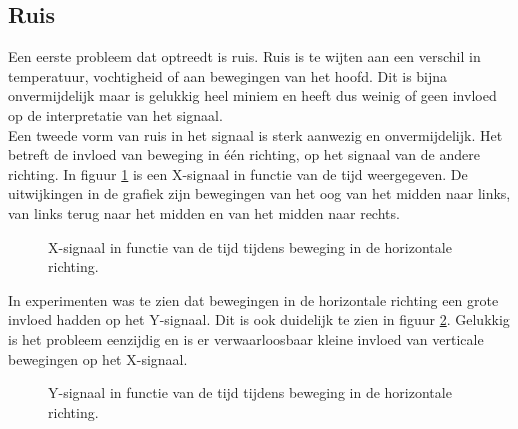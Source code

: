 \documentclass{article}
\newcommand{\figwidth}{0.82\linewidth}
\begin{document}
\subsection{Ruis}
Een eerste probleem dat optreedt is ruis. Ruis is te wijten aan een verschil in temperatuur, vochtigheid of aan bewegingen van het hoofd. Dit is bijna onvermijdelijk maar is gelukkig heel miniem en heeft dus weinig of geen invloed op de interpretatie van het signaal.\\
Een tweede vorm van ruis in het signaal is sterk aanwezig en onvermijdelijk. Het betreft de invloed van beweging in \'e\'en richting, op het signaal van de andere richting. In figuur \ref{fig:grafiekgevoeligheidY_2} is een X-signaal in functie van de tijd weergegeven. De uitwijkingen in de grafiek zijn bewegingen van het oog van het midden naar links, van links terug naar het midden en van het midden naar rechts.\\
\begin{figure}[H]
	\centering
	\caption{X-signaal in functie van de tijd tijdens beweging in de horizontale richting.}
	\label{fig:grafiekgevoeligheidY_2}
\end{figure}
In experimenten was te zien dat bewegingen in de horizontale richting een grote invloed hadden op het Y-signaal. Dit is ook duidelijk te zien in figuur \ref{fig:grafiekgevoeligheidY_1}. Gelukkig is het probleem eenzijdig en is er verwaarloosbaar kleine invloed van verticale bewegingen op het X-signaal.\\
\begin{figure}[H]	
	\centering
	\caption{Y-signaal in functie van de tijd tijdens beweging in de horizontale richting.}
	\label{fig:grafiekgevoeligheidY_1}
\end{figure}
\end{document}
